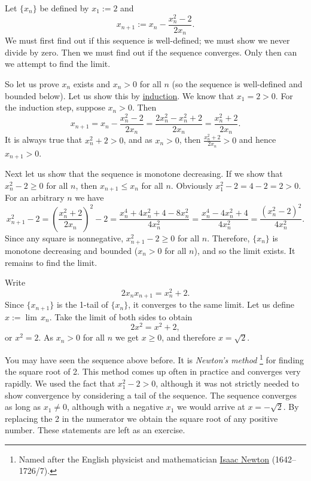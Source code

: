\begin{example}
Let $\{ x_n \}$ be defined by $x_1 := 2$ and
\begin{equation*}
x_{n+1} := x_n - \frac{x_n^2-2}{2x_n} .
\end{equation*}
We must first find out if this sequence is well-defined; we must show we never
divide by zero.
Then we must find out if the sequence converges.  Only then
can we attempt to find the limit.

So let us prove 
$x_n$ exists and $x_n > 0$ for all $n$ (so the sequence is well-defined
and bounded below).
Let us show this by \hyperref[induction:thm]{induction}.  We know that
$x_1 = 2 > 0$.  For the induction step, suppose $x_n > 0$.  Then
\begin{equation*}
x_{n+1} = x_n - \frac{x_n^2-2}{2x_n} =
\frac{2x_n^2 - x_n^2+2}{2x_n} =
\frac{x_n^2+2}{2x_n} .
\end{equation*}
It is always true that $x_n^2+2 > 0$,
and as
$x_n > 0$, then $\frac{x_n^2+2}{2x_n} > 0$ and hence $x_{n+1} > 0$.

Next let us
show that the sequence is monotone decreasing.  If we show that
$x_n^2-2 \geq 0$ for all $n$, then $x_{n+1} \leq x_n$ for all $n$.
Obviously $x_1^2-2 = 4-2 = 2 > 0$.  For an arbitrary $n$ we have 
\begin{equation*}
x_{n+1}^2-2 =
{\left( \frac{x_n^2+2}{2x_n} \right)}^2 - 2
=
\frac{x_n^4+4x_n^2+4 - 8x_n^2}{4x_n^2}
=
\frac{x_n^4-4x_n^2+4}{4x_n^2}
=
\frac{{\left( x_n^2-2 \right)}^2}{4x_n^2} .
\end{equation*}
Since any square is nonnegative,
$x_{n+1}^2-2 \geq 0$ for all $n$.  Therefore,
$\{ x_n \}$ is monotone decreasing and bounded ($x_n > 0$ for all $n$), and 
so the limit exists.  It remains to find the limit.

Write
\begin{equation*}
2x_nx_{n+1} = x_n^2+2 .
\end{equation*}
Since $\{ x_{n+1} \}$ is the 1-tail of $\{ x_n \}$, it converges to the
same limit.  Let us define $x := \lim\, x_n$.  Take the limit of
both sides to obtain
\begin{equation*}
2x^2 = x^2+2 ,
\end{equation*}
or $x^2 = 2$.  As $x_n > 0$ for all $n$ we get $x \geq 0$, and therefore $x = \sqrt{2}$.
\end{example}

You may have seen the sequence above before.  It is
\emph{Newton's method}%
\footnote{%
Named after the English physicist and mathematician
\href{https://en.wikipedia.org/wiki/Isaac_Newton}{Isaac Newton}
(1642--1726/7).}
for finding the square root of 2.  This method comes up often in
practice and converges very rapidly.  We used the fact that
$x_1^2 -2 >0$, although it was not strictly needed to show convergence by
considering a tail of the sequence.
The sequence converges as long as $x_1 \not= 0$, although with a negative $x_1$
we would arrive at $x=-\sqrt{2}$.  By replacing the 2 in the numerator we 
obtain the square root of any positive number.  These statements are left as
an exercise.

